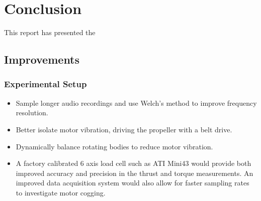 \documentclass[12pt,a4paper]{article}
\begin{document}








\section{Conclusion}


This report has presented the 


\subsection{Improvements}

\subsubsection{Experimental Setup}


\begin{itemize}
    \item Sample longer audio recordings and use Welch's method to improve frequency resolution.
    \item Better isolate motor vibration, driving the propeller with a belt drive.
    \item Dynamically balance rotating bodies to reduce motor vibration.
    \item A factory calibrated 6 axis load cell such as ATI Mini43 would provide both improved accuracy and precision in the thrust and torque measurements.
        An improved data acquisition system would also allow for faster sampling rates to investigate motor cogging.
\end{itemize}
\end{document}
